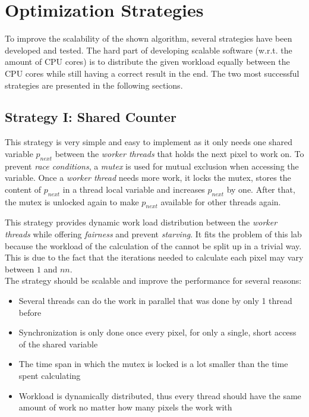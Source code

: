 \section{Optimization Strategies}
\label{sec:strategies}

To improve the scalability of the shown algorithm, several strategies have been developed and tested. The hard part of developing scalable software (w.r.t. the amount of CPU cores) is to distribute the given workload equally between the CPU cores while still having a correct result in the end. The two most successful strategies are presented in the following sections.

\subsection{Strategy I: Shared Counter}
\label{ssec:strategy-i}

This strategy is very simple and easy to implement as it only needs one shared variable $p_{next}$ between the \textit{worker threads} that holds the next pixel to work on. To prevent \textit{race conditions}, a \textit{mutex} is used for mutual exclusion when accessing the variable. Once a \textit{worker thread} needs more work, it locks the mutex, stores the content of $p_{next}$ in a thread local variable and increases $p_{next}$ by one. After that, the mutex is unlocked again to make $p_{next}$ available for other threads again.

This strategy provides dynamic work load distribution between the \textit{worker threads} while offering \textit{fairness} and prevent \textit{starving}. It fits the problem of this lab because the workload of the calculation of the \ms{} cannot be split up in a trivial way. This is due to the fact that the iterations needed to calculate each pixel may vary between $1$ and $nn$.\\


\noindent The strategy should be scalable and improve the performance for several reasons:
\begin{itemize}
    \item Several threads can do the work in parallel that was done by only 1 thread before
    \item Synchronization is only done once every pixel, for only a single, short access of the shared variable
    \item The time span in which the mutex is locked is a lot smaller than the time spent calculating
    \item Workload is dynamically distributed, thus every thread should have the same amount of work no matter how many pixels the work with
\end{itemize}


